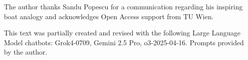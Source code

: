 \documentclass[reprint,aps,pra,superscriptaddress,longbibliography]{revtex4-2}
\begin{document}
\begin{acknowledgments}
The author thanks Sandu Popescu for a communication regarding his inspiring boat analogy and acknowledges Open Access support from TU Wien.

This text was partially created and revised with the following Large Language Model chatbots: Grok4-0709, Gemini 2.5 Pro, o3-2025-04-16. Prompts provided by the author.
\end{acknowledgments}


\end{document}
